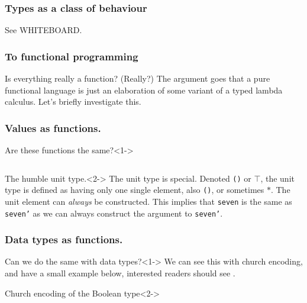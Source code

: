 \documentclass
  [hyperref={colorlinks = true,linkcolor = blue, 
             citecolor = blue, urlcolor = blue}
  ]{beamer}
\begin{document}
\begin{frame}[fragile]
\frametitle{Types as a class of behaviour}
See WHITEBOARD.
\end{frame}

\begin{frame}[fragile]
\frametitle{To functional programming}
\begin{block}{Is everything really a function? (Really?)}
The argument goes that a pure functional language is just
an elaboration of some variant of a typed lambda calculus.
Let's briefly investigate this.
\end{block}
\end{frame}

\begin{frame}[fragile]
\frametitle{Values as functions.}
  \begin{block}{Are these functions the same?}<1->
  \inputminted{idris}{../Code/src/Values.idr}
  \end{block}

  \begin{block}{The humble unit type.}<2->
  The unit type is special.
  Denoted \texttt{()} or $\top$, the unit type is
  defined as having only one single element, also
  \texttt{()}, or sometimes $\ast$.
  The unit element can \textit{always} be constructed.
  This implies that \texttt{seven} is the same as
  \texttt{seven'} as we can always construct the 
  argument to \texttt{seven'}.
  \end{block}
\end{frame}

\begin{frame}[fragile]
\frametitle{Data types as functions.}
  \begin{block}{Can we do the same with data types?}<1->
    We can see this with church encoding, and have a
    small example below, interested readers should see
    \cite[p. 58-68]{pierce2002types}.
  \end{block}

  \begin{block}{Church encoding of the Boolean type}<2->
    \inputminted{idris}{../Code/src/ChurchBools.idr}
  \end{block}
\end{frame}
\end{document}
